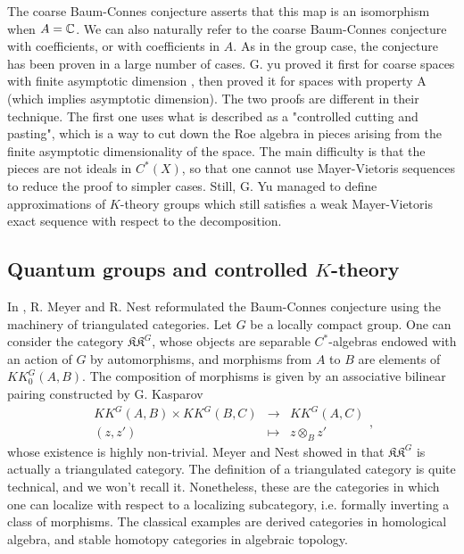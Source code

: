The coarse Baum-Connes conjecture asserts that this map is an isomorphism when $A=\mathbb C$. We can also naturally refer to the coarse Baum-Connes conjecture with coefficients, or with coefficients in $A$. As in the group case, the conjecture has been proven in a large number of cases. G. yu proved it first for coarse spaces with finite asymptotic dimension \cite{Yu1}, then proved it for spaces with property A \cite{Yu2} (which implies asymptotic dimension). The two proofs are different in their technique. The first one uses what is described as a "controlled cutting and pasting", which is a way to cut down the Roe algebra in pieces arising from the finite asymptotic dimensionality of the space. The main difficulty is that the pieces are not ideals in $C^*(X)$, so that one cannot use Mayer-Vietoris sequences to reduce the proof to simpler cases. Still, G. Yu managed to define approximations of $K$-theory groups which still satisfies a weak Mayer-Vietoris exact sequence with respect to the decomposition.        

\subsection{Quantum groups and controlled $K$-theory}     


In \cite{MeyerNest}, R. Meyer and R. Nest reformulated the Baum-Connes conjecture using the machinery of triangulated categories. Let $G$ be a locally compact group. One can consider the category $\mathfrak{KK}^G$, whose objects are separable $C^*$-algebras endowed with an action of $G$ by automorphisms, and morphisms from $A$ to $B$ are elements of $KK_0^G(A,B)$. The composition of morphisms is given by an associative bilinear pairing constructed by G. Kasparov \cite{Kasparov} 
\[\begin{array}{ccc} KK^G(A,B) \times KK^G(B,C) & \rightarrow & KK^G(A,C) \\ (z,z') & \mapsto & z\otimes_B z' \end{array},\]
whose existence is highly non-trivial. Meyer and Nest showed in \cite{MeyerNest} that $\mathfrak{KK}^G$ is actually a triangulated category. The definition of a triangulated category is quite technical, and we won't recall it. Nonetheless, these are the categories in which one can localize with respect to a localizing subcategory, i.e. formally inverting a class of morphisms. The classical examples are derived categories in homological algebra, and stable homotopy categories in algebraic topology.\\

